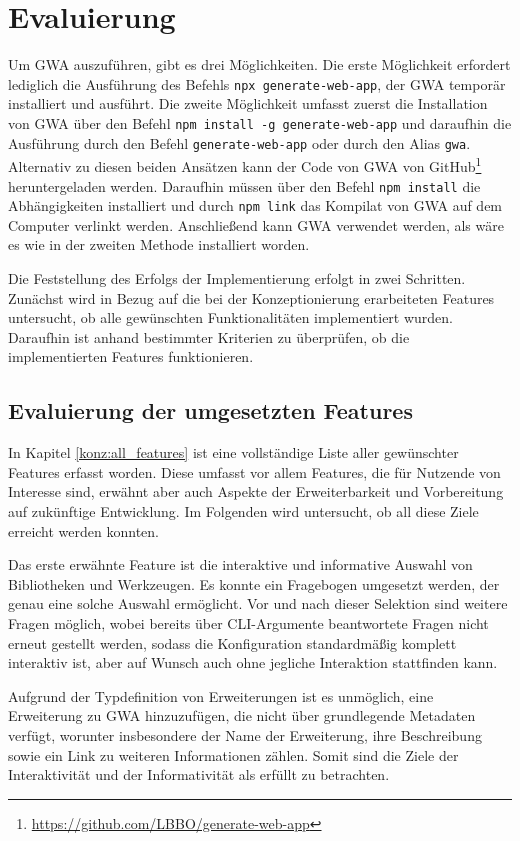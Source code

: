 \section{Evaluierung}
\label{eval}
Um \gls{GWA} auszuführen, gibt es drei Möglichkeiten. Die erste Möglichkeit erfordert lediglich die Ausführung des Befehls \verb/npx generate-web-app/, der \gls{GWA} temporär installiert und ausführt. Die zweite Möglichkeit umfasst zuerst die Installation von \gls{GWA} über den Befehl \verb/npm install -g generate-web-app/ und daraufhin die Ausführung durch den Befehl \verb/generate-web-app/ oder durch den Alias \verb/gwa/. Alternativ zu diesen beiden Ansätzen kann der Code von \gls{GWA} von GitHub\footnote{\url{https://github.com/LBBO/generate-web-app}} heruntergeladen werden. Daraufhin müssen über den Befehl \verb/npm install/ die Abhängigkeiten installiert und durch \verb/npm link/ das Kompilat von \gls{GWA} auf dem Computer verlinkt werden. Anschließend kann \gls{GWA} verwendet werden, als wäre es wie in der zweiten Methode installiert worden.

Die Feststellung des Erfolgs der Implementierung erfolgt in zwei Schritten. Zunächst wird in Bezug auf die bei der Konzeptionierung erarbeiteten Features untersucht, ob alle gewünschten Funktionalitäten implementiert wurden. Daraufhin ist anhand bestimmter Kriterien zu überprüfen, ob die implementierten Features funktionieren.

\subsection{Evaluierung der umgesetzten Features}
In Kapitel \ref{konz:all_features} ist eine vollständige Liste aller gewünschter Features erfasst worden. Diese umfasst vor allem Features, die für Nutzende von Interesse sind, erwähnt aber auch Aspekte der Erweiterbarkeit und Vorbereitung auf zukünftige Entwicklung. Im Folgenden wird untersucht, ob all diese Ziele erreicht werden konnten.

Das erste erwähnte Feature ist die interaktive und informative Auswahl von Bibliotheken und Werkzeugen. Es konnte ein Fragebogen umgesetzt werden, der genau eine solche Auswahl ermöglicht. Vor und nach dieser Selektion sind weitere Fragen möglich, wobei bereits über \gls{CLI}-Argumente beantwortete Fragen nicht erneut gestellt werden, sodass die Konfiguration standardmäßig komplett interaktiv ist, aber auf Wunsch auch ohne jegliche Interaktion stattfinden kann.

Aufgrund der Typdefinition von Erweiterungen ist es unmöglich, eine Erweiterung zu \gls{GWA} hinzuzufügen, die nicht über grundlegende Metadaten verfügt, worunter insbesondere der Name der Erweiterung, ihre Beschreibung sowie ein Link zu weiteren Informationen zählen. Somit sind die Ziele der Interaktivität und der Informativität als erfüllt zu betrachten.

